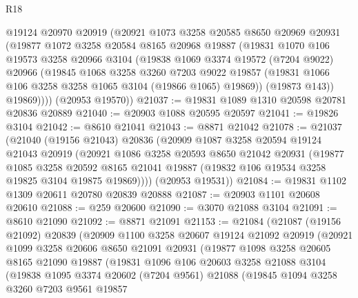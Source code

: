 \begin{lexlean}{R18}
\begin{coremodule}
        @19124
        @20970
        @20919
        (@20921
          @1073
          @3258
          @20585
          @8650
          @20969
          @20931
          (@19877
            @1072
            @3258
            @20584
            @8165
            @20968
            @19887
            (@19831
              @1070
              @106
              @19573
              @3258
              @20966
              @3104
              (@19838
                @1069
                @3374
                @19572
                (@7204 @9022)
                @20966
                (@19845
                  @1068
                  @3258
                  @3260
                  @7203
                  @9022
                  @19857
                  (@19831 @1066 @106 @3258 @3258 @1065 @3104 (@19866 @1065) @19869))
                (@19873 @143))
              @19869))))
      (@20953 @19570))
@21037 := @19831 @1089 @1310 @20598 @20781 @20836 @20889
@21040 := @20903 @1088 @20595 @20597
@21041 := @19826 @3104
@21042 := @8610 @21041
@21043 := @8871 @21042
@21078 := @21037
    (@21040
      (@19156 @21043)
      @20836
      (@20909
        @1087
        @3258
        @20594
        @19124
        @21043
        @20919
        (@20921
          @1086
          @3258
          @20593
          @8650
          @21042
          @20931
          (@19877
            @1085
            @3258
            @20592
            @8165
            @21041
            @19887
            (@19832 @106 @19534 @3258 @19825 @3104 @19875 @19869))))
      (@20953 @19531))
@21084 := @19831 @1102 @1309 @20611 @20780 @20839 @20888
@21087 := @20903 @1101 @20608 @20610
@21088 := @259 @20600
@21090 := @3070 @21088 @3104
@21091 := @8610 @21090
@21092 := @8871 @21091
@21153 := @21084
    (@21087
      (@19156 @21092)
      @20839
      (@20909
        @1100
        @3258
        @20607
        @19124
        @21092
        @20919
        (@20921
          @1099
          @3258
          @20606
          @8650
          @21091
          @20931
          (@19877
            @1098
            @3258
            @20605
            @8165
            @21090
            @19887
            (@19831
              @1096
              @106
              @20603
              @3258
              @21088
              @3104
              (@19838
                @1095
                @3374
                @20602
                (@7204 @9561)
                @21088
                (@19845
                  @1094
                  @3258
                  @3260
                  @7203
                  @9561
                  @19857

\end{coremodule}
\end{lexlean}
